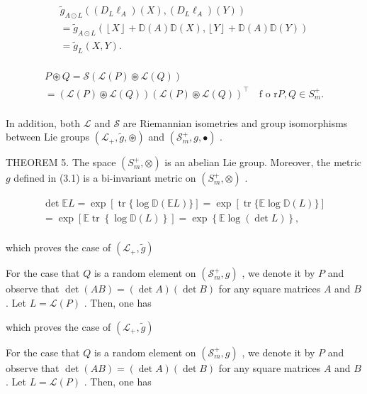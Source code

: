 \documentclass[11pt]{article}
\begin{document}
$$
\begin{array}{l} \tilde {g} _ {A \odot L} ((D _ {L} \ell_ {A}) (X), (D _ {L} \ell_ {A}) (Y)) \\ = \tilde {g} _ {A \odot L} (\left\lfloor X \right\rfloor + \mathbb {D} (A) \mathbb {D} (X), \left\lfloor Y \right\rfloor + \mathbb {D} (A) \mathbb {D} (Y)) \\ = \tilde {g} _ {L} (X, Y). \\ \end{array}
$$

$$
\begin{array}{l} P \circledast Q = \mathcal {S} (\mathcal {L} (P) \circledast \mathcal {L} (Q)) \\ = \left(\mathcal {L} (P) \circledast \mathcal {L} (Q)\right) \left(\mathcal {L} (P) \circledast \mathcal {L} (Q)\right) ^ {\top} \quad \text {f o r} P, Q \in S _ {m} ^ {+}. \\ \end{array}
$$

In addition, both  $\mathcal{L}$  and  $\mathcal{S}$  are Riemannian isometries and group isomorphisms between Lie groups  $(\mathcal{L}_{+},\tilde{g},\circledast)$  and  $(\mathcal{S}_m^+,g,\bullet)$ .

THEOREM 5. The space  $(S_m^+, \otimes)$  is an abelian Lie group. Moreover, the metric  $g$  defined in (3.1) is a bi-invariant metric on  $(S_m^+, \otimes)$ .

$$
\begin{array}{l} \det  \mathbb {E} L = \exp [ \operatorname {t r} \{\log \mathbb {D} (\mathbb {E} L) \} ] = \exp [ \operatorname {t r} \{\mathbb {E} \log \mathbb {D} (L) \} ] \\ = \exp \left[ \mathbb {E} \operatorname {t r} \left\{\log \mathbb {D} (L) \right\} \right] = \exp \left\{\mathbb {E} \log (\det  L) \right\}, \\ \end{array}
$$

which proves the case of  $(\mathcal{L}_{+},\tilde{g})$

For the case that  $Q$  is a random element on  $(\mathcal{S}_m^+, g)$ , we denote it by  $P$  and observe that  $\operatorname{det}(AB) = (\operatorname{det} A)(\operatorname{det} B)$  for any square matrices  $A$  and  $B$ . Let  $L = \mathcal{L}(P)$ . Then, one has

which proves the case of  $(\mathcal{L}_{+},\tilde{g})$

For the case that  $Q$  is a random element on  $(\mathcal{S}_m^+, g)$ , we denote it by  $P$  and observe that  $\operatorname{det}(AB) = (\operatorname{det} A)(\operatorname{det} B)$  for any square matrices  $A$  and  $B$ . Let  $L = \mathcal{L}(P)$ . Then, one has
\end{document}
